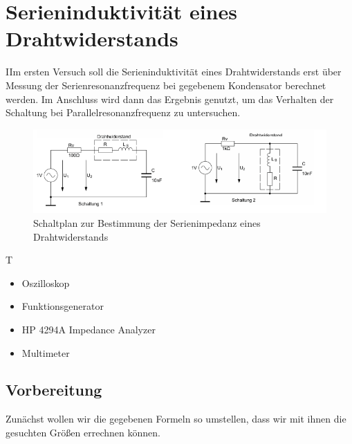 \documentclass{article}
\begin{document}
\tableofcontents


\newpage

\section{Serieninduktivität eines Drahtwiderstands}
\begin{task}
  IIm ersten Versuch soll die Serieninduktivität eines Drahtwiderstands erst über Messung der Serienresonanzfrequenz bei
  gegebenem Kondensator berechnet werden. Im Anschluss wird dann das Ergebnis genutzt, um das Verhalten der Schaltung bei Parallelresonanzfrequenz zu untersuchen.
\end{task}
\begin{figure}[h]
  \begin{center}
    \includegraphics[scale=0.8]{assets/images/Versuch1Schaltplan.PNG}
    \caption{Schaltplan zur Bestimmung der Serienimpedanz eines Drahtwiderstands}
  \end{center}
\end{figure}
\begin{devlist}
  T
  \begin{itemize}
    \item Oszilloskop
    \item Funktionsgenerator
    \item HP 4294A Impedance Analyzer
    \item Multimeter
  \end{itemize}
\end{devlist}
\subsection{Vorbereitung}
\begin{figure}

\end{figure}
Zunächst wollen wir die gegebenen Formeln so umstellen, dass wir mit ihnen die gesuchten Größen errechnen können.
\end{document}
